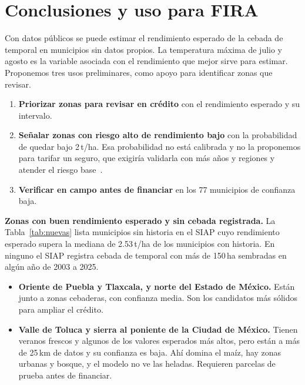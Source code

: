 \section{Conclusiones y uso para FIRA}\label{sec:conclusiones}

Con datos públicos se puede estimar el rendimiento esperado de la cebada de temporal en municipios sin datos propios.
La temperatura máxima de julio y agosto es la variable asociada con el rendimiento que mejor sirve para
estimar. Proponemos tres usos preliminares, como apoyo para identificar zonas que revisar.
\begin{enumerate}
\item \textbf{Priorizar zonas para revisar en crédito} con el rendimiento esperado y su intervalo.
\item \textbf{Señalar zonas con riesgo alto de rendimiento bajo} con la probabilidad de quedar bajo 2\,t/ha. Esa
probabilidad no está calibrada y no la proponemos para tarifar un seguro, que exigiría validarla con más años y
regiones y atender el riesgo base~\cite{barnett2007}.
\item \textbf{Verificar en campo antes de financiar} en los 77 municipios de confianza baja.
\end{enumerate}

\textbf{Zonas con buen rendimiento esperado y sin cebada registrada.} La Tabla~\ref{tab:nuevas} lista municipios
sin historia en el SIAP cuyo rendimiento esperado supera la mediana de 2.53\,t/ha de los municipios con historia. En
ninguno el SIAP registra cebada de temporal con más de 150\,ha sembradas en algún año de 2003 a 2025.
\begin{itemize}
\item \textbf{Oriente de Puebla y Tlaxcala, y norte del Estado de México.} Están junto a zonas cebaderas, con confianza
media. Son los candidatos más sólidos para ampliar el crédito.
\item \textbf{Valle de Toluca y sierra al poniente de la Ciudad de México.} Tienen veranos frescos y algunos de los
valores esperados más altos, pero están a más de 25\,km de datos y su confianza es baja. Ahí domina el maíz, hay zonas urbanas y
bosque, y el modelo no ve las heladas. Requieren parcelas de prueba antes de financiar.
\end{itemize}

